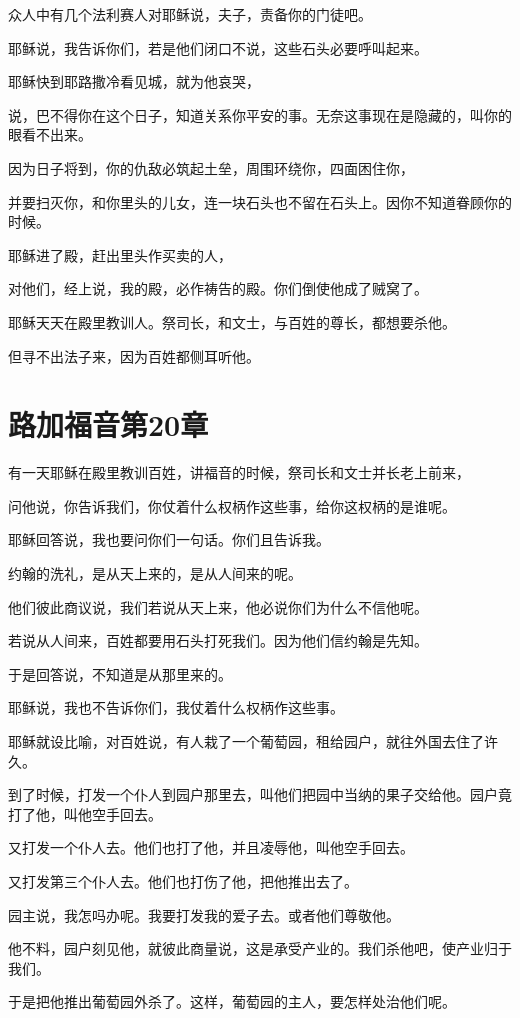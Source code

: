 \documentclass[12pt,oneside]{book}
\begin{document}
众人中有几个法利赛人对耶稣说，夫子，责备你的门徒吧。

耶稣说，我告诉你们，若是他们闭口不说，这些石头必要呼叫起来。

耶稣快到耶路撒冷看见城，就为他哀哭，

说，巴不得你在这个日子，知道关系你平安的事。无奈这事现在是隐藏的，叫你的眼看不出来。

因为日子将到，你的仇敌必筑起土垒，周围环绕你，四面困住你，

并要扫灭你，和你里头的儿女，连一块石头也不留在石头上。因你不知道眷顾你的时候。

耶稣进了殿，赶出里头作买卖的人，

对他们，经上说，我的殿，必作祷告的殿。你们倒使他成了贼窝了。

耶稣天天在殿里教训人。祭司长，和文士，与百姓的尊长，都想要杀他。

但寻不出法子来，因为百姓都侧耳听他。

\chapter{路加福音第20章}
有一天耶稣在殿里教训百姓，讲福音的时候，祭司长和文士并长老上前来，

问他说，你告诉我们，你仗着什么权柄作这些事，给你这权柄的是谁呢。

耶稣回答说，我也要问你们一句话。你们且告诉我。

约翰的洗礼，是从天上来的，是从人间来的呢。

他们彼此商议说，我们若说从天上来，他必说你们为什么不信他呢。

若说从人间来，百姓都要用石头打死我们。因为他们信约翰是先知。

于是回答说，不知道是从那里来的。

耶稣说，我也不告诉你们，我仗着什么权柄作这些事。

耶稣就设比喻，对百姓说，有人栽了一个葡萄园，租给园户，就往外国去住了许久。

到了时候，打发一个仆人到园户那里去，叫他们把园中当纳的果子交给他。园户竟打了他，叫他空手回去。

又打发一个仆人去。他们也打了他，并且凌辱他，叫他空手回去。

又打发第三个仆人去。他们也打伤了他，把他推出去了。

园主说，我怎吗办呢。我要打发我的爱子去。或者他们尊敬他。

他不料，园户刻见他，就彼此商量说，这是承受产业的。我们杀他吧，使产业归于我们。

于是把他推出葡萄园外杀了。这样，葡萄园的主人，要怎样处治他们呢。
\end{document}
